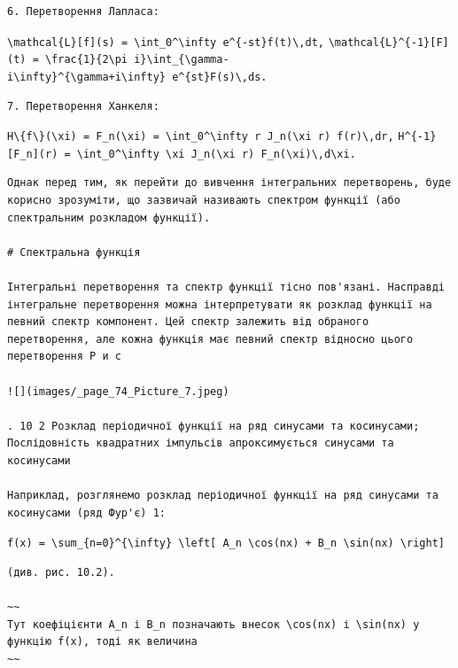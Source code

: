 \documentclass[
  ukrainian,
]{article}
\begin{document}
\begin{verbatim}
6. Перетворення Лапласа:
\end{verbatim}

\texttt{\textbackslash{}mathcal\{L\}{[}f{]}(s)\ =\ \textbackslash{}int\_0\^{}\textbackslash{}infty\ e\^{}\{-st\}f(t)\textbackslash{},dt,}
\texttt{\textbackslash{}mathcal\{L\}\^{}\{-1\}{[}F{]}(t)\ =\ \textbackslash{}frac\{1\}\{2\textbackslash{}pi\ i\}\textbackslash{}int\_\{\textbackslash{}gamma-i\textbackslash{}infty\}\^{}\{\textbackslash{}gamma+i\textbackslash{}infty\}\ e\^{}\{st\}F(s)\textbackslash{},ds.}

\begin{verbatim}
7. Перетворення Ханкеля:
\end{verbatim}

\texttt{H\textbackslash{}\{f\textbackslash{}\}(\textbackslash{}xi)\ =\ F\_n(\textbackslash{}xi)\ =\ \textbackslash{}int\_0\^{}\textbackslash{}infty\ r\ J\_n(\textbackslash{}xi\ r)\ f(r)\textbackslash{},dr,}
\texttt{H\^{}\{-1\}{[}F\_n{]}(r)\ =\ \textbackslash{}int\_0\^{}\textbackslash{}infty\ \textbackslash{}xi\ J\_n(\textbackslash{}xi\ r)\ F\_n(\textbackslash{}xi)\textbackslash{},d\textbackslash{}xi.}

\begin{verbatim}
Однак перед тим, як перейти до вивчення інтегральних перетворень, буде корисно зрозуміти, що зазвичай називають спектром функції (або спектральним розкладом функції).

# Спектральна функція

Інтегральні перетворення та спектр функції тісно пов'язані. Насправді інтегральне перетворення можна інтерпретувати як розклад функції на певний спектр компонент. Цей спектр залежить від обраного перетворення, але кожна функція має певний спектр відносно цього перетворення Р и с

![](images/_page_74_Picture_7.jpeg)

. 10 2 Розклад періодичної функції на ряд синусами та косинусами; Послідовність квадратних імпульсів апроксимується синусами та косинусами

Наприклад, розглянемо розклад періодичної функції на ряд синусами та косинусами (ряд Фур'є) 1:
\end{verbatim}

\texttt{f(x)\ =\ \textbackslash{}sum\_\{n=0\}\^{}\{\textbackslash{}infty\}\ \textbackslash{}left{[}\ A\_n\ \textbackslash{}cos(nx)\ +\ B\_n\ \textbackslash{}sin(nx)\ \textbackslash{}right{]}}

\begin{verbatim}
(див. рис. 10.2).

~~
Тут коефіцієнти A_n і B_n позначають внесок \cos(nx) і \sin(nx) у функцію f(x), тоді як величина
~~
\end{verbatim}
\end{document}
